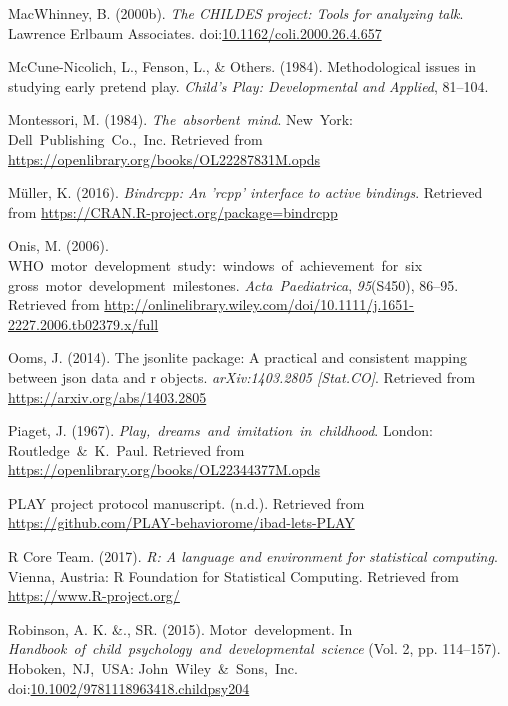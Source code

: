 \documentclass[english,man]{apa6}
\theoremstyle{definition}
\theoremstyle{definition}
\theoremstyle{definition}
\theoremstyle{remark}
\begin{document}
\hypertarget{ref-MacWhinney2000-fb}{}
MacWhinney, B. (2000b). \emph{The CHILDES project: Tools for analyzing
talk}. Lawrence Erlbaum Associates.
doi:\href{https://doi.org/10.1162/coli.2000.26.4.657}{10.1162/coli.2000.26.4.657}

\hypertarget{ref-McCune-Nicolich1984-tn}{}
McCune-Nicolich, L., Fenson, L., \& Others. (1984). Methodological
issues in studying early pretend play. \emph{Child's Play: Developmental
and Applied}, 81--104.

\hypertarget{ref-Montessori1984-la}{}
Montessori, M. (1984). \emph{The~absorbent~mind}. New~York:
Dell~Publishing~Co.,~Inc. Retrieved from
\url{https://openlibrary.org/books/OL22287831M.opds}

\hypertarget{ref-R-bindrcpp}{}
Müller, K. (2016). \emph{Bindrcpp: An 'rcpp' interface to active
bindings}. Retrieved from
\url{https://CRAN.R-project.org/package=bindrcpp}

\hypertarget{ref-Onis2006-le}{}
Onis, M. (2006).
WHO~motor~development~study:~windows~of~achievement~for~six
gross~motor~development~milestones. \emph{Acta~Paediatrica},
\emph{95}(S450), 86--95. Retrieved from
\url{http://onlinelibrary.wiley.com/doi/10.1111/j.1651-2227.2006.tb02379.x/full}

\hypertarget{ref-R-jsonlite}{}
Ooms, J. (2014). The jsonlite package: A practical and consistent
mapping between json data and r objects. \emph{arXiv:1403.2805
{[}Stat.CO{]}}. Retrieved from \url{https://arxiv.org/abs/1403.2805}

\hypertarget{ref-Piaget1967-nl}{}
Piaget, J. (1967). \emph{Play,~dreams~and~imitation~in~childhood}.
London: Routledge~\&~K.~Paul. Retrieved from
\url{https://openlibrary.org/books/OL22344377M.opds}

\hypertarget{ref-ibad-PLAY-github}{}
PLAY project protocol manuscript. (n.d.). Retrieved from
\url{https://github.com/PLAY-behaviorome/ibad-lets-PLAY}

\hypertarget{ref-R-base}{}
R Core Team. (2017). \emph{R: A language and environment for statistical
computing}. Vienna, Austria: R Foundation for Statistical Computing.
Retrieved from \url{https://www.R-project.org/}

\hypertarget{ref-Robinson2015-qe}{}
Robinson, A. K. \&., SR. (2015). Motor~development. In
\emph{Handbook~of~child~psychology~and~developmental~science} (Vol. 2,
pp. 114--157). Hoboken,~NJ,~USA: John~Wiley~\&~Sons,~Inc.
doi:\href{https://doi.org/10.1002/9781118963418.childpsy204}{10.1002/9781118963418.childpsy204}
\end{document}
